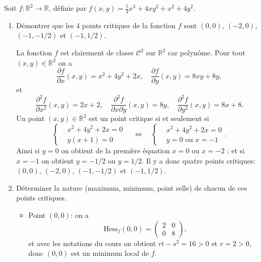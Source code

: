 \documentclass[a4paper]{tp_um}
\begin{document}
\exo{}
Soit $f : \mathbb R^2 \to \mathbb R$, définie par $f(x,y) = \tfrac13 x^3 + 4 xy^2 + x^2 +4y^2$.
\begin{enumerate}
    \item Démontrer que les 4 points critiques de la fonction $f$ sont $(0,0)$, $(-2,0)$, $(-1,-1/2)$ et $(-1,1/2)$.

        \medskip

La fonction $f$ est clairement de classe $\mathcal C^2$ sur $\mathbb R^2$ car polyn\^ome. Pour tout $(x,y) \in \mathbb R^2$ on a
$$
\frac{\partial f}{ \partial x}(x,y) = x^2 + 4y^2 + 2x , \quad
\frac{\partial f}{ \partial y}(x,y) = 8xy + 8y,
$$
et
$$
\frac{\partial^2 f}{ \partial x^2}(x,y) = 2x+2 , \quad
\frac{\partial^2 f}{ \partial x \partial y}(x,y) = 8y , \quad
\frac{\partial^2 f}{ \partial y^2}(x,y) = 8x+8.
$$
Un point $(x,y) \in \mathbb R^2$ est un point critique si et seulement si
$$
\left\{
\begin{aligned}
& x^2 + 4y^2 + 2x = 0 \\
&  y(x + 1)=0
\end{aligned}
\right.
\quad \Leftrightarrow \quad 
\left\{
\begin{aligned}
& x^2 + 4y^2 + 2x = 0 \\
& y=0 \text{ ou } x=-1
\end{aligned}
\right. .
$$
Ainsi si $y=0$ on obtient de la premi\`ere \'equation $x = 0$ ou $x=-2$ ; et si $x=-1$ on obtient $y=-1/2$ ou $y=1/2$. Il y a donc quatre points critiques: $(0,0)$, $(-2,0)$, $(-1,-1/2)$ et $(-1,1/2)$.

        \medskip

    \item Déterminer la nature (maximum, minimum, point selle) de chacun de ces points critiques.

        \medskip

        \begin{itemize}
            \item
                Point $(0,0)$: on a
                $$
                \mathrm{Hess}_f (0,0) = \left(\begin{matrix} 
                        2 & 0 \\
                        0 & 8  
                \end{matrix} \right),
                $$
                et avec les notations du cours on obtient $rt-s^2 = 16 > 0$ et $r=2>0$, donc $(0,0)$ est un minimum local de $f$. 


\end{itemize}
\end{enumerate}
\end{document}
